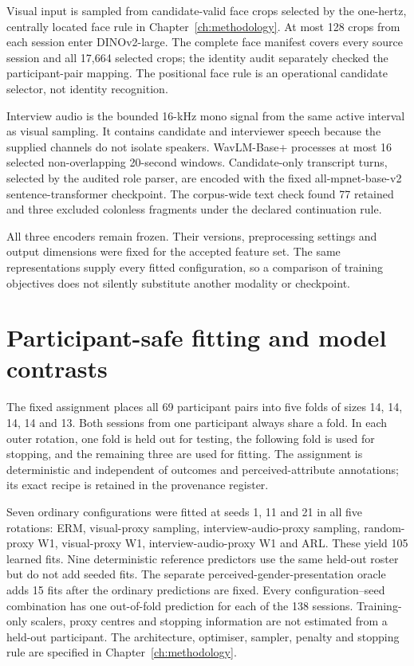 Visual input is sampled from candidate-valid face crops selected by the one-hertz, centrally
located face rule in Chapter~\ref{ch:methodology}. At most 128 crops from each session enter
DINOv2-large. The complete face manifest covers every source session and all 17,664 selected
crops; the identity audit separately checked the participant-pair mapping. The positional face
rule is an operational candidate selector, not identity recognition.

Interview audio is the bounded 16-kHz mono signal from the same active interval as visual
sampling. It contains candidate and interviewer speech because the supplied channels do not
isolate speakers. WavLM-Base+ processes at most 16 selected non-overlapping 20-second windows.
Candidate-only transcript turns, selected by the audited role parser, are encoded with the
fixed all-mpnet-base-v2 sentence-transformer checkpoint. The corpus-wide text check found 77
retained and three excluded colonless fragments under the declared continuation rule.

All three encoders remain frozen. Their versions, preprocessing settings and output dimensions
were fixed for the accepted feature set. The same representations supply every fitted
configuration, so a comparison of
training objectives does not silently substitute another modality or checkpoint.

\section{Participant-safe fitting and model contrasts}

The fixed assignment places all 69 participant pairs into five folds of sizes 14, 14, 14, 14
and 13. Both sessions from one participant always share a fold. In each outer rotation, one
fold is held out for testing, the following fold is used for stopping, and the remaining
three are used for fitting. The assignment is deterministic and independent of outcomes and
perceived-attribute annotations; its exact recipe is retained in the provenance register.

Seven ordinary configurations were fitted at seeds 1, 11 and 21 in all five rotations:
ERM, visual-proxy sampling, interview-audio-proxy sampling, random-proxy W1,
visual-proxy W1, interview-audio-proxy W1 and ARL. These yield 105 learned fits.
Nine deterministic reference predictors use the same held-out roster but do not add seeded
fits. The separate perceived-gender-presentation oracle adds 15 fits after the ordinary
predictions are fixed. Every configuration--seed combination has one out-of-fold prediction
for each of the 138 sessions. Training-only scalers, proxy centres and stopping information
are not estimated from a held-out participant. The architecture, optimiser, sampler, penalty
and stopping rule are specified in Chapter~\ref{ch:methodology}.

